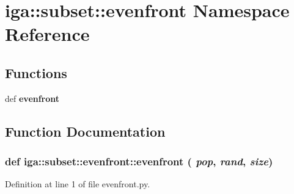 \section{iga::subset::evenfront Namespace Reference}
\label{namespaceiga_1_1subset_1_1evenfront}


\subsection*{Functions}
\begin{CompactItemize}
\item 
def {\bf evenfront}
\end{CompactItemize}


\subsection{Function Documentation}
\subsubsection{\setlength{\rightskip}{0pt plus 5cm}def iga::subset::evenfront::evenfront ( {\em pop},  {\em rand},  {\em size})}\label{namespaceiga_1_1subset_1_1evenfront_76050b525c5c2ec3515569dc4f626f11}




Definition at line 1 of file evenfront.py.